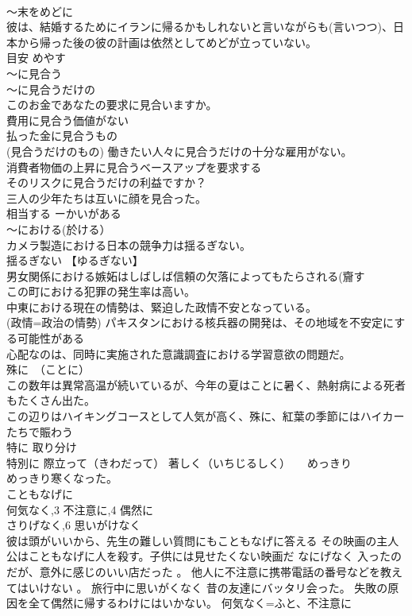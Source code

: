 \documentclass[8pt]{extreport}
\begin{document}
\begin{CJK}{UTF8}{min}
\\	～末をめどに 
\\	彼は、結婚するためにイランに帰るかもしれないと言いながらも(言いつつ)、日本から帰った後の彼の計画は依然としてめどが立っていない。 
\\	目安 めやす 
\\	～に見合う
\\	～に見合うだけの
\\	このお金であなたの要求に見合いますか。 
\\	費用に見合う価値がない 
\\	払った金に見合うもの 
\\	(見合うだけのもの) 働きたい人々に見合うだけの十分な雇用がない。
\\	消費者物価の上昇に見合うベースアップを要求する 
\\	そのリスクに見合うだけの利益ですか？ 
\\	三人の少年たちは互いに顔を見合った。 
\\	相当する ーかいがある
\\	～における(於ける）	
\\	カメラ製造における日本の競争力は揺るぎない。 
\\	揺るぎない 【ゆるぎない】 
\\	男女関係における嫉妬はしばしば信頼の欠落によってもたらされる(齎す 
\\	この町における犯罪の発生率は高い。
\\	中東における現在の情勢は、緊迫した政情不安となっている。
\\	(政情=政治の情勢) パキスタンにおける核兵器の開発は、その地域を不安定にする可能性がある 
\\	心配なのは、同時に実施された意識調査における学習意欲の問題だ。 
\\	殊に　（ことに）	
\\	この数年は異常高温が続いているが、今年の夏はことに暑く、熱射病による死者もたくさん出た。 
\\	この辺りはハイキングコースとして人気が高く、殊に、紅葉の季節にはハイカーたちで賑わう 
\\	特に 取り分け 
\\	特別に 際立って（きわだって） 著しく（いちじるしく）　　めっきり
\\	めっきり寒くなった。 
\\	こともなげに 
\\	何気なく,3 不注意に,4 偶然に 
\\	さりげなく,6 思いがけなく	
\\	彼は頭がいいから、先生の難しい質問にもこともなげに答える その映画の主人公はこともなげに人を殺す。子供には見せたくない映画だ なにげなく 入ったのだが、意外に感じのいい店だった 。 他人に不注意に携帯電話の番号などを教えてはいけない 。 旅行中に思いがくなく 昔の友達にバッタリ会った。 失敗の原因を全て偶然に帰するわけにはいかない。		何気なく=ふと、不注意に 

\end{CJK}
\end{document}
